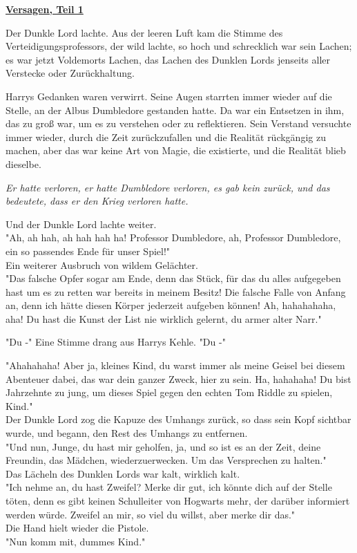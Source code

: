 

\hypertarget{versagen-teil-1}{%

\textbf{\uline{Versagen, Teil 1}}

Der Dunkle Lord lachte. Aus der leeren Luft kam die Stimme des Verteidigungsprofessors, der wild lachte, so hoch und schrecklich war sein Lachen; es war jetzt Voldemorts Lachen, das Lachen des Dunklen Lords jenseits aller Verstecke oder Zurückhaltung.

Harrys Gedanken waren verwirrt. Seine Augen starrten immer wieder auf die Stelle, an der Albus Dumbledore gestanden hatte. Da war ein Entsetzen in ihm, das zu groß war, um es zu verstehen oder zu reflektieren. Sein Verstand versuchte immer wieder, durch die Zeit zurückzufallen und die Realität rückgängig zu machen, aber das war keine Art von Magie, die existierte, und die Realität blieb dieselbe.

\emph{Er hatte verloren, er hatte Dumbledore verloren, es gab kein zurück, und das bedeutete, dass er den Krieg verloren hatte.}

Und der Dunkle Lord lachte weiter.\\ "Ah, ah hah, ah hah hah ha! Professor Dumbledore, ah, Professor Dumbledore, ein so passendes Ende für unser Spiel!"\\ Ein weiterer Ausbruch von wildem Gelächter.\\ "Das falsche Opfer sogar am Ende, denn das Stück, für das du alles aufgegeben hast um es zu retten war bereits in meinem Besitz! Die falsche Falle von Anfang an, denn ich hätte diesen Körper jederzeit aufgeben können! Ah, hahahahaha, aha! Du hast die Kunst der List nie wirklich gelernt, du armer alter Narr."

"Du -" Eine Stimme drang aus Harrys Kehle. "Du -"

"Ahahahaha! Aber ja, kleines Kind, du warst immer als meine Geisel bei diesem Abenteuer dabei, das war dein ganzer Zweck, hier zu sein. Ha, hahahaha! Du bist Jahrzehnte zu jung, um dieses Spiel gegen den echten Tom Riddle zu spielen, Kind."\\ Der Dunkle Lord zog die Kapuze des Umhangs zurück, so dass sein Kopf sichtbar wurde, und begann, den Rest des Umhangs zu entfernen.\\ "Und nun, Junge, du hast mir geholfen, ja, und so ist es an der Zeit, deine Freundin, das Mädchen, wiederzuerwecken. Um das Versprechen zu halten."\\ Das Lächeln des Dunklen Lords war kalt, wirklich kalt.\\ "Ich nehme an, du hast Zweifel? Merke dir gut, ich könnte dich auf der Stelle töten, denn es gibt keinen Schulleiter von Hogwarts mehr, der darüber informiert werden würde. Zweifel an mir, so viel du willst, aber merke dir das."\\ Die Hand hielt wieder die Pistole.\\ "Nun komm mit, dummes Kind."

}
